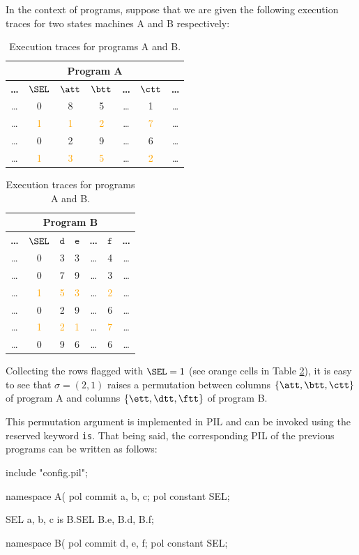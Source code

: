 In the context of programs, suppose that we are given the following execution traces for two states machines \textsf{A} and \textsf{B} respectively:
\begin{table}[H]
\centering
\begin{tabular}{|c|c|c|c|c|c|c|}
\hline
\multicolumn{7}{|c|}{\textbf{Program A}} \\
\hline
\textbf{\dots} &$\SEL$	&$\att$	&$\btt$	&\textbf{\dots}	&$\ctt$	&\textbf{\dots}	\\ \hline
\dots	&0	&8	&5	&\dots	&1	&\dots \\
\dots	&\textcolor{orange}{1}	&\textcolor{orange}{1}	&\textcolor{orange}{2}	&\dots	&\textcolor{orange}{7}	&\dots \\
\dots	&0	&2	&9	&\dots	&6	&\dots \\
\dots	&\textcolor{orange}{1}	&\textcolor{orange}{3}	&\textcolor{orange}{5}	&\dots	&\textcolor{orange}{2}	&\dots \\
\hline
\end{tabular}
\begin{tabular}{|c|c|c|c|c|c|c|}
\hline
\multicolumn{7}{|c|}{\textbf{Program B}} \\
\hline
\textbf{\dots} &$\SEL$	&$\mathtt{d}$	&$\mathtt{e}$	&\textbf{\dots}	&$\mathtt{f}$	&\textbf{\dots}	\\ \hline
\dots	&0	&3	&3	&\dots	&4	&\dots \\
\dots	&0	&7	&9	&\dots	&3	&\dots \\
\dots	&\textcolor{orange}{1}	&\textcolor{orange}{5}	&\textcolor{orange}{3}	&\dots	&\textcolor{orange}{2}	&\dots \\
\dots	&0	&2	&9	&\dots	&6	&\dots \\
\dots	&\textcolor{orange}{1}	&\textcolor{orange}{2}	&\textcolor{orange}{1}	&\dots	&\textcolor{orange}{7}	&\dots \\
\dots	&0	&9	&6	&\dots	&6	&\dots \\
\hline
\end{tabular}
\caption{Execution traces for programs \textsf{A} and \textsf{B}. }
\label{table:permutation-args-B}
\end{table}

Collecting the rows flagged with $\SEL = 1$ (see orange cells in Table \ref{table:permutation-args-B}), it is easy to see that $\sigma = (2, 1)$ raises a permutation between columns $\{\att,\btt,\ctt\}$ of program \textsf{A} and columns $\{\ett,\dtt,\ftt\}$ of program \textsf{B}. 

This permutation argument is implemented in PIL and can be invoked using the reserved keyword \texttt{is}. That being said, the corresponding PIL of the previous programs can be written as follows:
\begin{pil}
include "config.pil";

namespace A(%
    pol commit a, b, c;
    pol constant SEL;

    SEL {a, b, c} is B.SEL {B.e, B.d, B.f};

namespace B(%
    pol commit d, e, f;
    pol constant SEL;
\end{pil}



